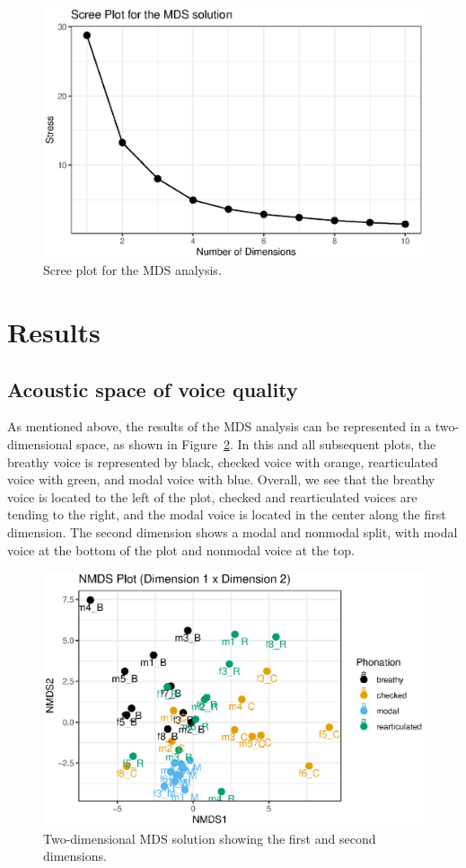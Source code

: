 \begin{figure}[!h]
    \centering
    \includegraphics[width = 0.9\linewidth]{images/stress_plot.eps}
    \caption{Scree plot for the MDS analysis.}
    \label{fig:stress_plot}
\end{figure}
\section{Results} \label{sec:acousticlandscape:results}
\subsection{Acoustic space of voice quality} \label{sec:acousticlandscape:space}
As mentioned above, the results of the MDS analysis can be represented in a two-dimensional space, as shown in Figure~\ref{fig:nmds12}. In this and all subsequent plots, the breathy voice is represented by black, checked voice with orange, rearticulated voice with green, and modal voice with blue. Overall, we see that the breathy voice is located to the left of the plot, checked and rearticulated voices are tending to the right, and the modal voice is located in the center along the first dimension. The second dimension shows a modal and nonmodal split, with modal voice at the bottom of the plot and nonmodal voice at the top.
\begin{figure}[!h]
    \centering
    \includegraphics[width = 0.9\linewidth]{images/nmds12.eps}
    \caption{Two-dimensional MDS solution showing the first and second dimensions.}
    \label{fig:nmds12}
\end{figure}
    
